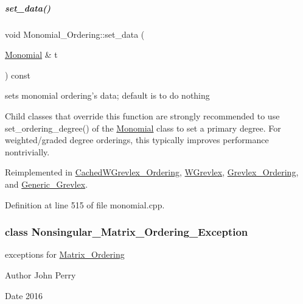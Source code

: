 \mbox{\label{group__orderinggroup_a22b08dffd1cdf3a655ca18d604cfcee1}} 
\subparagraph{\texorpdfstring{set\+\_\+data()}{set\_data()}}
{\footnotesize\ttfamily void Monomial\+\_\+\+Ordering\+::set\+\_\+data (\begin{DoxyParamCaption}\item[{\hyperlink{group__polygroup_class_monomial}{Monomial} \&}]{t }\end{DoxyParamCaption}) const\hspace{0.3cm}{\ttfamily [virtual]}}



sets monomial ordering's data; default is to do nothing 

Child classes that override this function are strongly recommended to use set\+\_\+ordering\+\_\+degree() of the \hyperlink{group__polygroup_class_monomial}{Monomial} class to set a primary degree. For weighted/graded degree orderings, this typically improves performance nontrivially. 

Reimplemented in \hyperlink{group__orderinggroup_a65f1e27ee52413c91ffcb87632dcb27c}{Cached\+W\+Grevlex\+\_\+\+Ordering}, \hyperlink{group__orderinggroup_a18ba60cd0a76da002303a11d362142d9}{W\+Grevlex}, \hyperlink{group__orderinggroup_a83abd3e7505fe2096b01b8146bfdd83f}{Grevlex\+\_\+\+Ordering}, and \hyperlink{group__orderinggroup_a14c344858da03d16c8019afdae3da5dc}{Generic\+\_\+\+Grevlex}.



Definition at line 515 of file monomial.\+cpp.

\label{class_nonsingular___matrix___ordering___exception}
\subsubsection{class Nonsingular\+\_\+\+Matrix\+\_\+\+Ordering\+\_\+\+Exception}
exceptions for \hyperlink{group__orderinggroup_class_matrix___ordering}{Matrix\+\_\+\+Ordering} 

\begin{DoxyAuthor}{Author}
John Perry 
\end{DoxyAuthor}
\begin{DoxyDate}{Date}
2016 
\end{DoxyDate}



